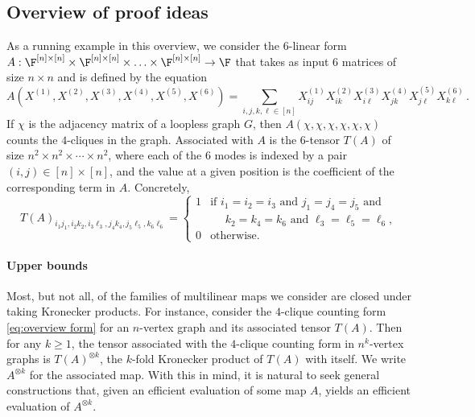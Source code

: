 \subsection{Overview of proof ideas}

\label{sect:ideas}

As a running example in this overview, we consider the $6$-linear
%
%
form  %
$A: \F^{[n] \times [n]} \times \F^{[n] \times [n]} \times \ldots
\times \F^{[n] \times [n]} \rightarrow \F$
%
%
that takes as input $6$ matrices of size $n \times n$ and is
defined by the equation  %
\begin{equation}
\label{eq:overview form}
A(X^{(1)}, X^{(2)}, X^{(3)}, X^{(4)}, X^{(5)}, X^{(6)}) = \sum_{i, j, k, \ell \in[n]} X^{(1)}_{ij} X^{(2)}_{ik} X^{(3)}_{i\ell} X^{(4)}_{jk} X^{(5)}_{j\ell} X^{(6)}_{k\ell}\,.
\end{equation}
If $\chi$ is the adjacency matrix of a loopless graph $G$, then $A(\chi, \chi, \chi, \chi, \chi,
\chi)$ counts the %
$4$-cliques in the graph.  Associated with $A$ is the $6$-tensor $T(A)$ of size $n^2 \times n^2 \times \cdots \times n^2$, where each of the $6$ modes is indexed by a pair $(i, j) \in [n] \times [n]$, 
and the value at a given position is the coefficient of the corresponding
term in $A$.  Concretely,
\[
%
%
%
%
%
T(A)_{i_1j_1, i_2k_2, i_3\ell_3, j_4k_4, j_5\ell_5, k_6\ell_6} =
\begin{cases}
  1 & \!\!\! \text{if $i_1 = i_2 = i_3$ and $j_1 = j_4 = j_5$ and}\\
  & \!\!\! \text{$\,\,\,\,\,\,\,\, k_2 = k_4 = k_6$ and $\ell_3 = \ell_5 = \ell_6$},\\
  0 & \!\!\! \text{otherwise}.
\end{cases}
\]

\paragraph*{Upper bounds}

Most, but not all, of the families of multilinear maps we consider are
closed under taking Kronecker products.  For instance, consider the
$4$-clique counting form \eqref{eq:overview form} for an $n$-vertex
graph and its associated tensor $T(A)$.  Then for any
$k \ge 1$, the tensor associated with the $4$-clique counting form in
$n^k$-vertex graphs is $T(A)^{\otimes k}$, the $k$-fold Kronecker
product of $T(A)$ with itself.  We write $A^{\otimes k}$ for the
associated map.  With this in mind, it is natural to seek general
constructions that, given an efficient evaluation
of some map $A$, yields an efficient evaluation of $A^{\otimes k}$.

